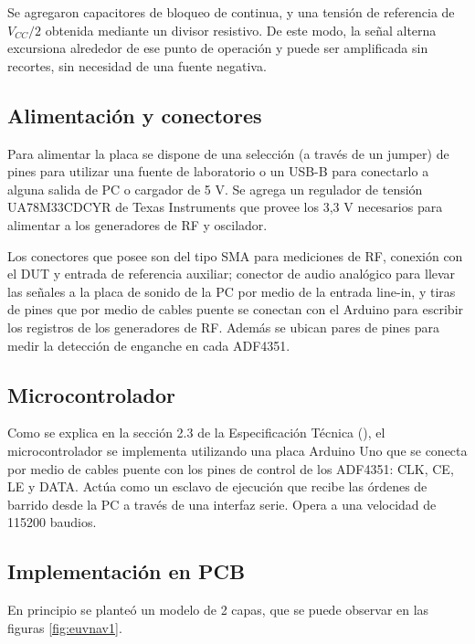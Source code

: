 Se agregaron capacitores de bloqueo de continua, y una tensión de referencia de $V_{CC} / 2 $ obtenida mediante un divisor resistivo. De este modo, la señal alterna excursiona alrededor de ese punto de operación y puede ser amplificada sin recortes, sin necesidad de una fuente negativa.

\subsection{Alimentación y conectores}
Para alimentar la placa se dispone de una selección (a través de un jumper) de pines para utilizar una fuente de laboratorio o un USB-B para conectarlo a alguna salida de PC o cargador de 5 V. Se agrega un regulador de tensión UA78M33CDCYR \cite{datasheet_ua78m} de Texas Instruments que provee los 3,3 V necesarios para alimentar a los generadores de RF y oscilador.

Los conectores que posee son del tipo SMA para mediciones de RF, conexión con el DUT y entrada de referencia auxiliar; conector de audio analógico para llevar las señales a la placa de sonido de la PC por medio de la entrada line-in, y tiras de pines que por medio de cables puente se conectan con el Arduino para escribir los registros de los generadores de RF. Además se ubican pares de pines para medir la detección de enganche en cada ADF4351.

\subsection{Microcontrolador}
Como se explica en la sección 2.3 de la Especificación Técnica (\cite{ET}), el microcontrolador se implementa utilizando una placa Arduino Uno que se conecta por medio de cables puente con los pines de control de los ADF4351: CLK, CE, LE y DATA. Actúa como un esclavo de ejecución que recibe las órdenes de barrido desde la PC a través de una interfaz serie. Opera a una velocidad de 115200 baudios.

\subsection{Implementación en PCB}
En principio se planteó un modelo de 2 capas, que se puede observar en las figuras \ref{fig:euvnav1}.


